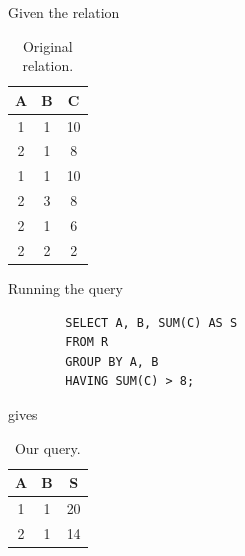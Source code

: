    \begin{example}
      Given the relation 

      \begin{table}[H]
        \centering
        \begin{tabular}{|c|c|c|}
          \hline
          \textbf{A} & \textbf{B} & \textbf{C} \\
          \hline
          1 & 1 & 10 \\ 
          2 & 1 & 8 \\ 
          1 & 1 & 10 \\ 
          2 & 3 & 8 \\ 
          2 & 1 & 6 \\ 
          2 & 2 & 2 \\ 
          \hline
        \end{tabular}
        \caption{Original relation. }
        \label{tab:groupby2}
      \end{table}
    
      Running the query 
      \begin{lstlisting}
        SELECT A, B, SUM(C) AS S 
        FROM R 
        GROUP BY A, B 
        HAVING SUM(C) > 8; 
      \end{lstlisting}
      gives 
      
      \begin{table}[H]
        \centering
        \begin{tabular}{|c|c|c|}
          \hline
          \textbf{A} & \textbf{B} & \textbf{S} \\
          \hline
          1 & 1 & 20 \\ 
          2 & 1 & 14 \\ 
          \hline
        \end{tabular}
        \caption{Our query. }
        \label{tab:groupby2_output}
      \end{table}
    \end{example}

